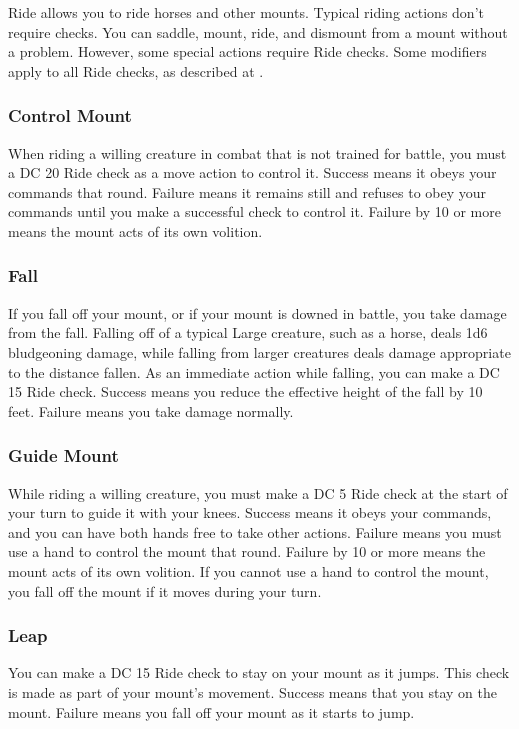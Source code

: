 Ride allows you to ride horses and other mounts. Typical riding actions don't require checks. You can saddle, mount, ride, and dismount from a mount without a problem. However, some special actions require Ride checks. Some modifiers apply to all Ride checks, as described at .

\subsubsection{Control Mount}
When riding a willing creature in combat that is not trained for battle, you must a DC 20 Ride check as a move action to control it. Success means it obeys your commands that round. Failure means it remains still and refuses to obey your commands until you make a successful check to control it. Failure by 10 or more means the mount acts of its own volition.

\subsubsection{Fall}
If you fall off your mount, or if your mount is downed in battle, you take damage from the fall. Falling off of a typical Large creature, such as a horse, deals 1d6 bludgeoning damage, while falling from larger creatures deals damage appropriate to the distance fallen. As an immediate action while falling, you can make a DC 15 Ride check. Success means you reduce the effective height of the fall by 10 feet. Failure means you take damage normally.

\subsubsection{Guide Mount}
While riding a willing creature, you must make a DC 5 Ride check at the start of your turn to guide it with your knees. Success means it obeys your commands, and you can have both hands free to take other actions. Failure means you must use a hand to control the mount that round. Failure by 10 or more means the mount acts of its own volition. If you cannot use a hand to control the mount, you fall off the mount if it moves during your turn.

\subsubsection{Leap}
You can make a DC 15 Ride check to stay on your mount as it jumps. This check is made as part of your mount's movement. Success means that you stay on the mount. Failure means you fall off your mount as it starts to jump.

